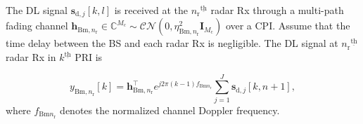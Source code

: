 \documentclass[9pt,journal]{IEEEtran}
\newcommand{\paren}[1]{\left({#1}\right)}
\newcommand{\bracket}[1]{{\left [{#1}\right ]}}
\newcommand{\braces}[1]{{\left\{ {#1}\right\}}}
\newcommand{\ith}[1]    {{#1}^{\underline{\text{th}}}}
\newcommand{\rr}{_\mathrm{r}}
\newcommand{\target}{\mathrm{t}}
\newcommand{\sfrac}[2]{#1/#2}
\theoremstyle{definition}
\begin{document}
 
The DL signal $\mathbf{s}_{\textrm{d},j}\bracket{k,l}$ is received at the $\ith{n\rr}$ radar Rx through a multi-path fading channel $\mathbf{h}_{\mathrm{Bm},n\rr}\in\mathbb{C}^{\mathit{M}_\mathrm{c}}\sim \mathcal{CN}\paren{0,\eta^2_{\textrm{Bm},n\rr}\mathbf{I}_{\mathit{M}_\mathrm{c}}}$ over a CPI. Assume that the time delay between the BS and each radar Rx is negligible. The DL signal at $\ith{n\rr}$ radar Rx in $
\ith{k}$ PRI is\par\noindent\small
\begin{equation}
y_{\mathrm{Bm},n\rr}\bracket{k}=\mathbf{h}_{\mathrm{Bm},n\rr}^\top e^{j2\pi\paren{k-1} f_{\mathrm{Bm}n_\mathrm{r}}}
\sum_{j=1}^\mathit{J}\mathbf{s}_{\textrm{d},j}\bracket{k,n+1},\label{eq:DL_direct}
\end{equation}\normalsize
where $f_{\mathrm{Bm}n_\mathrm{r}}$ denotes the normalized channel Doppler frequency.  
\end{document}
